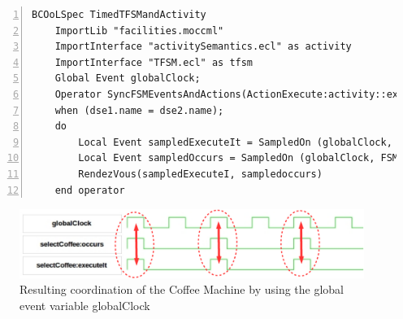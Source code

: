 	\begin{lstlisting}[language=bcool,
	caption={Synchronized product operator between the TFSM and Activity languages by using Event Variables},
	label={lst:bcoolrunningexampletimed}, 
	basicstyle=\scriptsize\ttfamily, backgroundcolor=\color{LGrey}, numbers=left, xleftmargin=2pt]
	BCOoLSpec TimedTFSMandActivity
	ImportLib "facilities.moccml"
	ImportInterface "activitySemantics.ecl" as activity
	ImportInterface "TFSM.ecl" as tfsm
	Global Event globalClock;
	Operator SyncFSMEventsAndActions(ActionExecute:activity::executeIt, FSMEventOccurs:tfsm::occurs)
	when (dse1.name = dse2.name);
	do
		Local Event sampledExecuteIt = SampledOn (globalClock, ActionExecute);
		Local Event sampledOccurs = SampledOn (globalClock, FSMEventOccurs);
		RendezVous(sampledExecuteI, sampledoccurs)
	end operator
	\end{lstlisting}
	
	
	 \begin{figure}[h]
		\center
		\includegraphics[width=.8\textwidth]{bcool/figs/runningeventvar}
		\caption{Resulting coordination of the Coffee Machine by using the global event variable globalClock}
		\label{fig:runningeventvar}
	\end{figure}
	




